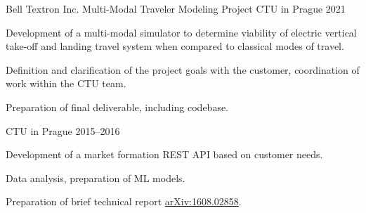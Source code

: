 \begin{cventries}
  \cventry
    {Bell Textron Inc. Multi-Modal Traveler Modeling Project} %
    {
    } %
    {CTU in Prague} %
    {2021} %
    {
      \begin{cvitems} %
        \item {Development of a multi-modal simulator to determine viability of electric vertical take-off and landing travel system when compared to classical modes of travel.}
        \item {Definition and clarification of the project goals with the customer, coordination of work within the CTU team.}
        \item {Preparation of final deliverable, including codebase. }
      \end{cvitems}
    }

  \cventry
    {} %
    {} %
    {CTU in Prague} %
    {2015--2016} %
    {
      \begin{cvitems} %
        \item {Development of a market formation REST API based on customer needs.}
        \item {Data analysis, preparation of ML models.}
        \item {Preparation of brief technical report \href{https://arxiv.org/abs/1608.02858}{arXiv:1608.02858}.}
      \end{cvitems}
    }

\end{cventries}
    




